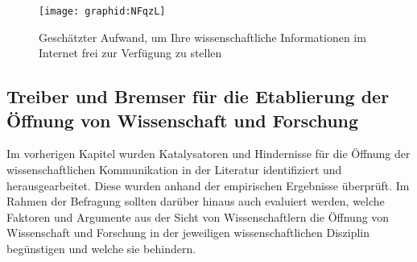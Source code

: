 \begin{figure}[h!]
\texttt{[image: graphid:NFqzL]}
\caption{Geschätzter Aufwand, um Ihre wissenschaftliche Informationen im Internet frei zur Verfügung zu stellen}
\end{figure}

\subsection{Treiber und Bremser für die Etablierung der Öffnung von Wissenschaft und Forschung}

Im vorherigen Kapitel wurden Katalysatoren und Hindernisse für die Öffnung der wissenschaftlichen Kommunikation in der Literatur identifiziert und herausgearbeitet. Diese wurden anhand der empirischen Ergebnisse überprüft. Im Rahmen der Befragung sollten darüber hinaus auch evaluiert werden, welche Faktoren und Argumente aus der Sicht von Wissenschaftlern die Öffnung von Wissenschaft und Forschung in der jeweiligen wissenschaftlichen Disziplin begünstigen und welche sie behindern.

